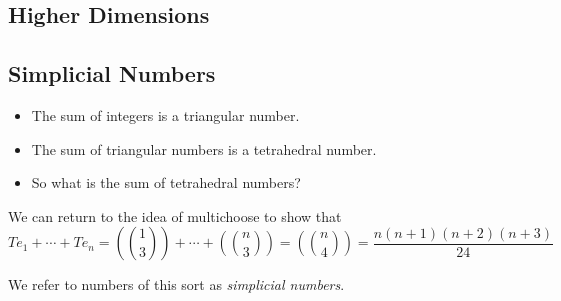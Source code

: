 \documentclass[12pt]{scrippsposter}
\newcommand{\mchoose}[2]{{ \textstyle( \! {#1 \choose #2} \! )}}
\begin{document}
\begin{poster}
\section{  Higher Dimensions }

\subsection{ Simplicial Numbers}
\begin{itemize}
\item The sum of integers is a triangular number.
\item The sum of triangular numbers is a tetrahedral number.
\item So what is the sum of tetrahedral numbers?
\end{itemize}

We can return to the idea of multichoose to show that 
\begin{equation}
Te_1+\dotsb+Te_n = \mchoose{1}{3}+\dotsb+\mchoose{n}{3} = \mchoose{n}{4} =\textstyle \frac{n(n+1)(n+2)(n+3)}{24}
\end{equation}

We refer to numbers of this sort as \emph{simplicial numbers}. 



\end{poster}
\end{document}
